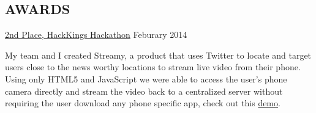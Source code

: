 \documentclass[line,margin]{cv}
\begin{document}
\begin{resume}
\section{AWARDS}

\href{https://hackkings2014s.devpost.com/submissions}{2nd Place, HackKings Hackathon}
\hfill Feburary 2014

\begin{adjustwidth}{2.0em}{2.0em}
    My team and I created Streamy, a product that uses Twitter to locate 
    and target users close to the news worthy locations to stream live video 
    from their phone. Using only HTML5 and JavaScript we were able to access 
    the user's phone camera directly and stream the video back to a 
    centralized server without requiring the user download any phone specific 
    app, check out this \href{http://www.youtube.com/watch?v=JjMc1OaKEU0}{demo}.
\end{adjustwidth}


\end{resume}
\end{document}
